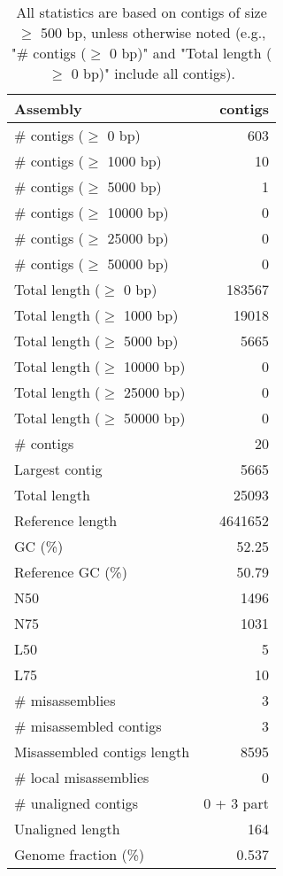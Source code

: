 \documentclass[12pt,a4paper]{article}
\begin{document}
\begin{table}[ht]
\begin{center}
\caption{All statistics are based on contigs of size $\geq$ 500 bp, unless otherwise noted (e.g., "\# contigs ($\geq$ 0 bp)" and "Total length ($\geq$ 0 bp)" include all contigs).}
\begin{tabular}{|l*{1}{|r}|}
\hline
Assembly & contigs \\ \hline
\# contigs ($\geq$ 0 bp) & 603 \\ \hline
\# contigs ($\geq$ 1000 bp) & 10 \\ \hline
\# contigs ($\geq$ 5000 bp) & 1 \\ \hline
\# contigs ($\geq$ 10000 bp) & 0 \\ \hline
\# contigs ($\geq$ 25000 bp) & 0 \\ \hline
\# contigs ($\geq$ 50000 bp) & 0 \\ \hline
Total length ($\geq$ 0 bp) & 183567 \\ \hline
Total length ($\geq$ 1000 bp) & 19018 \\ \hline
Total length ($\geq$ 5000 bp) & 5665 \\ \hline
Total length ($\geq$ 10000 bp) & 0 \\ \hline
Total length ($\geq$ 25000 bp) & 0 \\ \hline
Total length ($\geq$ 50000 bp) & 0 \\ \hline
\# contigs & 20 \\ \hline
Largest contig & 5665 \\ \hline
Total length & 25093 \\ \hline
Reference length & 4641652 \\ \hline
GC (\%) & 52.25 \\ \hline
Reference GC (\%) & 50.79 \\ \hline
N50 & 1496 \\ \hline
N75 & 1031 \\ \hline
L50 & 5 \\ \hline
L75 & 10 \\ \hline
\# misassemblies & 3 \\ \hline
\# misassembled contigs & 3 \\ \hline
Misassembled contigs length & 8595 \\ \hline
\# local misassemblies & 0 \\ \hline
\# unaligned contigs & 0 + 3 part \\ \hline
Unaligned length & 164 \\ \hline
Genome fraction (\%) & 0.537 \\ \hline

\end{tabular}
\end{center}
\end{table}
\end{document}
